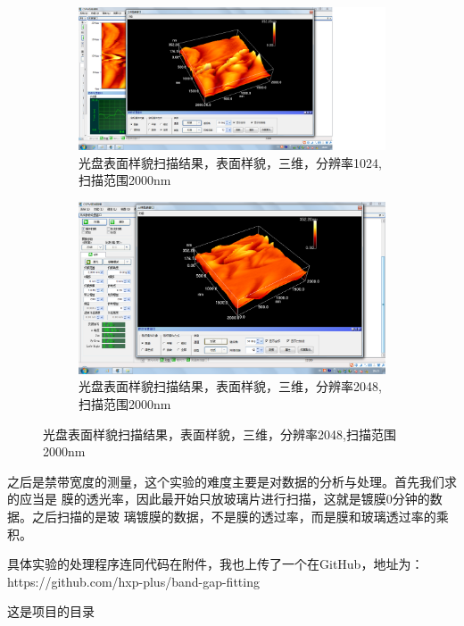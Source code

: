 \documentclass{ctexart}
\begin{document}
\begin{figure}[H]
  \centering
  \begin{subfigure}{.49\textwidth}
    \centering
    \includegraphics[width=\linewidth]{AFM结果图像/光盘表面样貌三维_1024_2000nm}
    \caption{光盘表面样貌扫描结果，表面样貌，三维，分辨率1024,扫描范围2000nm}
  \end{subfigure}
  \begin{subfigure}{.49\textwidth}
    \centering
    \includegraphics[width=\linewidth]{AFM结果图像/光盘表面样貌三维_2048_2000nm}
    \caption{光盘表面样貌扫描结果，表面样貌，三维，分辨率2048,扫描范围2000nm}
  \end{subfigure}
\end{figure}

之后是禁带宽度的测量，这个实验的难度主要是对数据的分析与处理。首先我们求的应当是
膜的透光率，因此最开始只放玻璃片进行扫描，这就是镀膜0分钟的数据。之后扫描的是玻
璃镀膜的数据，不是膜的透过率，而是膜和玻璃透过率的乘积。

具体实验的处理程序连同代码在附件，我也上传了一个在GitHub，地址为：
https://github.com/hxp-plus/band-gap-fitting

这是项目的目录
\end{document}
